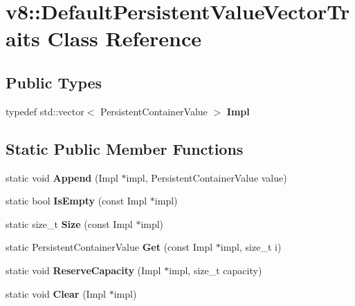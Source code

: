 \hypertarget{classv8_1_1DefaultPersistentValueVectorTraits}{}\section{v8\+:\+:Default\+Persistent\+Value\+Vector\+Traits Class Reference}
\label{classv8_1_1DefaultPersistentValueVectorTraits}
\subsection*{Public Types}
\begin{DoxyCompactItemize}
\item 
\mbox{\label{classv8_1_1DefaultPersistentValueVectorTraits_ac5093f7deea6cfc8672c529be4afdef4}} 
typedef std\+::vector$<$ Persistent\+Container\+Value $>$ {\bfseries Impl}
\end{DoxyCompactItemize}
\subsection*{Static Public Member Functions}
\begin{DoxyCompactItemize}
\item 
\mbox{\label{classv8_1_1DefaultPersistentValueVectorTraits_ac3088f4b37e68ca9ed668a859f89cf21}} 
static void {\bfseries Append} (Impl $\ast$impl, Persistent\+Container\+Value value)
\item 
\mbox{\label{classv8_1_1DefaultPersistentValueVectorTraits_a5b410d98817c143d2a3bf0e9dac34bd0}} 
static bool {\bfseries Is\+Empty} (const Impl $\ast$impl)
\item 
\mbox{\label{classv8_1_1DefaultPersistentValueVectorTraits_a49748bb910ea3482c078c1a8e566bd44}} 
static size\+\_\+t {\bfseries Size} (const Impl $\ast$impl)
\item 
\mbox{\label{classv8_1_1DefaultPersistentValueVectorTraits_ab9787aa7b041a30714cd17258c886cd7}} 
static Persistent\+Container\+Value {\bfseries Get} (const Impl $\ast$impl, size\+\_\+t i)
\item 
\mbox{\label{classv8_1_1DefaultPersistentValueVectorTraits_afda15875d9691152b30549e4dbe4eb95}} 
static void {\bfseries Reserve\+Capacity} (Impl $\ast$impl, size\+\_\+t capacity)
\item 
\mbox{\label{classv8_1_1DefaultPersistentValueVectorTraits_ab15a15e95f274defd3362536ae502361}} 
static void {\bfseries Clear} (Impl $\ast$impl)
\end{DoxyCompactItemize}


